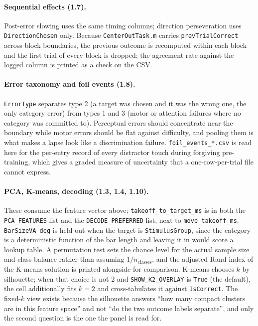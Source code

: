\documentclass[11pt,a4paper]{article}
\newcommand{\code}[1]{\texttt{\small #1}}
\newcommand{\file}[1]{\texttt{\small #1}}
\begin{document}
\paragraph{Sequential effects (1.7).} Post-error slowing uses the same timing
columns; direction perseveration uses \code{DirectionChosen} only. Because
\file{CenterOutTask.m} carries \code{prevTrialCorrect} across block boundaries,
the previous outcome is recomputed within each block and the first trial of
every block is dropped; the agreement rate against the logged column is printed
as a check on the CSV.

\paragraph{Error taxonomy and foil events (1.8).} \code{ErrorType} separates
type 2 (a target was chosen and it was the wrong one, the only category error)
from types 1 and 3 (motor or attention failures where no category was committed
to). Perceptual errors should concentrate near the boundary while motor errors
should be flat against difficulty, and pooling them is what makes a lapse look
like a discrimination failure. \code{foil\_events\_*.csv} is read here for the
per-entry record of every distractor touch during forgiving pre-training, which
gives a graded measure of uncertainty that a one-row-per-trial file cannot
express.

\paragraph{PCA, K-means, decoding (1.3, 1.4, 1.10).} These consume the feature
vector above; \code{takeoff\_to\_target\_ms} is in both the \code{PCA\_FEATURES}
list and the \code{DECODE\_PREFERRED} list, next to \code{move\_takeoff\_ms}.
\code{BarSizeVA\_deg} is held out when the target is \code{StimulusGroup}, since
the category is a deterministic function of the bar length and leaving it in
would score a lookup table. A permutation test sets the chance level for the
actual sample size and class balance rather than assuming
$1/n_{\text{classes}}$, and the adjusted Rand index of the K-means solution is
printed alongside for comparison. K-means chooses $k$ by silhouette; when that
choice is not 2 and \code{SHOW\_K2\_OVERLAY} is \code{True} (the default), the
cell additionally fits $k = 2$ and cross-tabulates it against \code{IsCorrect}.
The fixed-$k$ view exists because the silhouette answers ``how many compact
clusters are in this feature space'' and not ``do the two outcome labels
separate'', and only the second question is the one the panel is read for.
\end{document}
